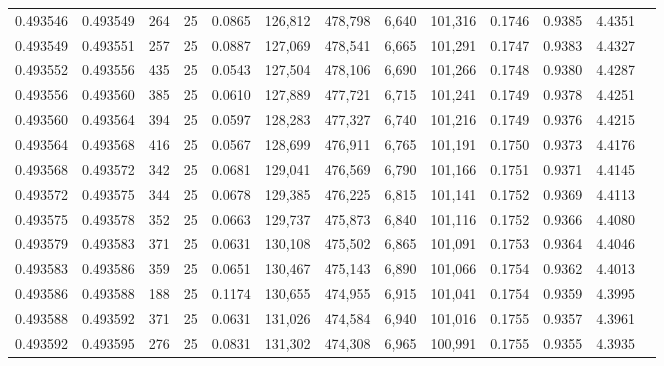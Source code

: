 \begin{tabular}{rrrrrrrrrrrrr}
0.493546 & 0.493549 &   264 &  25 &                                     0.0865 & 126,812 & 478,798 &   6,640 & 101,316 & 0.1746 & 0.9385 & 4.4351 \\
0.493549 & 0.493551 &   257 &  25 &                                     0.0887 & 127,069 & 478,541 &   6,665 & 101,291 & 0.1747 & 0.9383 & 4.4327 \\
0.493552 & 0.493556 &   435 &  25 &                                     0.0543 & 127,504 & 478,106 &   6,690 & 101,266 & 0.1748 & 0.9380 & 4.4287 \\
0.493556 & 0.493560 &   385 &  25 &                                     0.0610 & 127,889 & 477,721 &   6,715 & 101,241 & 0.1749 & 0.9378 & 4.4251 \\
0.493560 & 0.493564 &   394 &  25 &                                     0.0597 & 128,283 & 477,327 &   6,740 & 101,216 & 0.1749 & 0.9376 & 4.4215 \\
0.493564 & 0.493568 &   416 &  25 &                                     0.0567 & 128,699 & 476,911 &   6,765 & 101,191 & 0.1750 & 0.9373 & 4.4176 \\
0.493568 & 0.493572 &   342 &  25 &                                     0.0681 & 129,041 & 476,569 &   6,790 & 101,166 & 0.1751 & 0.9371 & 4.4145 \\
0.493572 & 0.493575 &   344 &  25 &                                     0.0678 & 129,385 & 476,225 &   6,815 & 101,141 & 0.1752 & 0.9369 & 4.4113 \\
0.493575 & 0.493578 &   352 &  25 &                                     0.0663 & 129,737 & 475,873 &   6,840 & 101,116 & 0.1752 & 0.9366 & 4.4080 \\
0.493579 & 0.493583 &   371 &  25 &                                     0.0631 & 130,108 & 475,502 &   6,865 & 101,091 & 0.1753 & 0.9364 & 4.4046 \\
0.493583 & 0.493586 &   359 &  25 &                                     0.0651 & 130,467 & 475,143 &   6,890 & 101,066 & 0.1754 & 0.9362 & 4.4013 \\
0.493586 & 0.493588 &   188 &  25 &                                     0.1174 & 130,655 & 474,955 &   6,915 & 101,041 & 0.1754 & 0.9359 & 4.3995 \\
0.493588 & 0.493592 &   371 &  25 &                                     0.0631 & 131,026 & 474,584 &   6,940 & 101,016 & 0.1755 & 0.9357 & 4.3961 \\
0.493592 & 0.493595 &   276 &  25 &                                     0.0831 & 131,302 & 474,308 &   6,965 & 100,991 & 0.1755 & 0.9355 & 4.3935 \\

\end{tabular}
